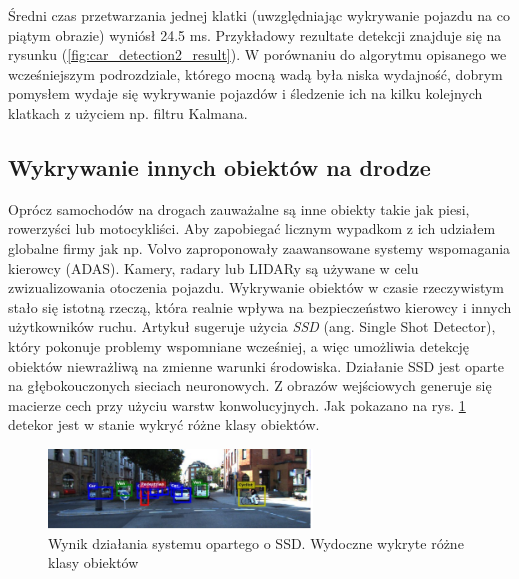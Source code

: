 Średni czas przetwarzania jednej klatki (uwzględniając wykrywanie pojazdu na co piątym obrazie) wyniósł 24.5 ms. Przykładowy rezultate detekcji znajduje się na rysunku (\ref{fig:car_detection2_result}).
W porównaniu do algorytmu opisanego we wcześniejszym podrozdziale, którego mocną wadą była niska wydajność, dobrym pomysłem wydaje się wykrywanie pojazdów i śledzenie ich na kilku kolejnych klatkach z użyciem np. filtru Kalmana.




\subsection{Wykrywanie innych obiektów na drodze}
Oprócz samochodów na drogach zauważalne są inne obiekty takie jak piesi, rowerzyści lub motocykliści. Aby zapobiegać licznym wypadkom z ich udziałem globalne firmy jak np. Volvo zaproponowały zaawansowane systemy wspomagania kierowcy (ADAS).
Kamery, radary lub LIDARy są używane w celu zwizualizowania otoczenia pojazdu. Wykrywanie obiektów w czasie rzeczywistym stało się istotną rzeczą, która realnie wpływa na bezpieczeństwo kierowcy i innych użytkowników ruchu.
Artykuł \cite{T12} sugeruje użycia \textit{SSD} (ang. Single Shot Detector), który pokonuje problemy wspomniane wcześniej, a więc umożliwia detekcję obiektów niewrażliwą na zmienne warunki środowiska.
Działanie SSD jest oparte na głębokouczonych sieciach neuronowych. Z obrazów wejściowych generuje się macierze cech przy użyciu warstw konwolucyjnych. 
Jak pokazano na rys. \ref{fig:pedestrian_detect_result} detekor jest w stanie wykryć różne klasy obiektów.

\begin{figure}
  \centering
  \includegraphics[width=7cm]{img/pedestrian_detect_result.png}
  \caption{Wynik działania systemu opartego o SSD. Wydoczne wykryte różne klasy obiektów \cite{T11}}
  \label{fig:pedestrian_detect_result}
\end{figure}


